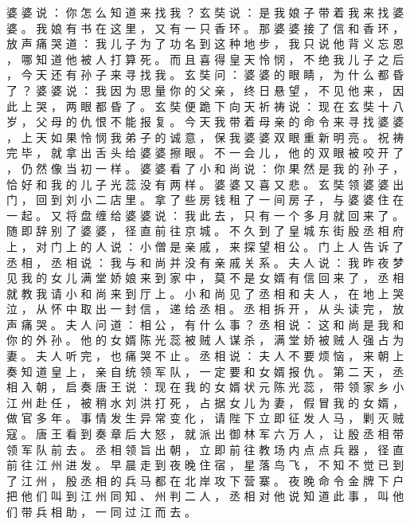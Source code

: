 {婆 婆 说 ： 你 怎 么 知 道 来 找 我 ？ 玄 奘 说 ： 是 我 娘 子 带 着 我 来 找 婆 婆 。
我 娘 有 书 在 这 里 ， 又 有 一 只 香 环 。
那 婆 婆 接 了 信 和 香 环 ， 放 声 痛 哭 道 ： 我 儿 子 为 了 功 名 到 这 种 地 步 ， 我 只 说 他 背 义 忘 恩 ， 哪 知 道 他 被 人 打 算 死 。
而 且 喜 得 皇 天 怜 悯 ， 不 绝 我 儿 子 之 后 ， 今 天 还 有 孙 子 来 寻 找 我 。
玄 奘 问 ： 婆 婆 的 眼 睛 ， 为 什 么 都 昏 了 ？ 婆 婆 说 ： 我 因 为 思 量 你 的 父 亲 ， 终 日 悬 望 ， 不 见 他 来 ， 因 此 上 哭 ， 两 眼 都 昏 了 。
玄 奘 便 跪 下 向 天 祈 祷 说 ： 现 在 玄 奘 十 八 岁 ， 父 母 的 仇 恨 不 能 报 复 。
今 天 我 带 着 母 亲 的 命 令 来 寻 找 婆 婆 ， 上 天 如 果 怜 悯 我 弟 子 的 诚 意 ， 保 我 婆 婆 双 眼 重 新 明 亮 。
祝 祷 完 毕 ， 就 拿 出 舌 头 给 婆 婆 擦 眼 。
不 一 会 儿 ， 他 的 双 眼 被 咬 开 了 ， 仍 然 像 当 初 一 样 。
婆 婆 看 了 小 和 尚 说 ： 你 果 然 是 我 的 孙 子 ， 恰 好 和 我 的 儿 子 光 蕊 没 有 两 样 。
婆 婆 又 喜 又 悲 。
玄 奘 领 婆 婆 出 门 ， 回 到 刘 小 二 店 里 。
拿 了 些 房 钱 租 了 一 间 房 子 ， 与 婆 婆 住 在 一 起 。
又 将 盘 缠 给 婆 婆 说 ： 我 此 去 ， 只 有 一 个 多 月 就 回 来 了 。
随 即 辞 别 了 婆 婆 ， 径 直 前 往 京 城 。
不 久 到 了 皇 城 东 街 殷 丞 相 府 上 ， 对 门 上 的 人 说 ： 小 僧 是 亲 戚 ， 来 探 望 相 公 。
门 上 人 告 诉 了 丞 相 ， 丞 相 说 ： 我 与 和 尚 并 没 有 亲 戚 关 系 。
夫 人 说 ： 我 昨 夜 梦 见 我 的 女 儿 满 堂 娇 娘 来 到 家 中 ， 莫 不 是 女 婿 有 信 回 来 了 ， 丞 相 就 教 我 请 小 和 尚 来 到 厅 上 。
小 和 尚 见 了 丞 相 和 夫 人 ， 在 地 上 哭 泣 ， 从 怀 中 取 出 一 封 信 ， 递 给 丞 相 。
丞 相 拆 开 ， 从 头 读 完 ， 放 声 痛 哭 。
夫 人 问 道 ： 相 公 ， 有 什 么 事 ？ 丞 相 说 ： 这 和 尚 是 我 和 你 的 外 孙 。
他 的 女 婿 陈 光 蕊 被 贼 人 谋 杀 ， 满 堂 娇 被 贼 人 强 占 为 妻 。
夫 人 听 完 ， 也 痛 哭 不 止 。
丞 相 说 ： 夫 人 不 要 烦 恼 ， 来 朝 上 奏 知 道 皇 上 ， 亲 自 统 领 军 队 ， 一 定 要 和 女 婿 报 仇 。
第 二 天 ， 丞 相 入 朝 ， 启 奏 唐 王 说 ： 现 在 我 的 女 婿 状 元 陈 光 蕊 ， 带 领 家 乡 小 江 州 赴 任 ， 被 稍 水 刘 洪 打 死 ， 占 据 女 儿 为 妻 ， 假 冒 我 的 女 婿 ， 做 官 多 年 。
事 情 发 生 异 常 变 化 ， 请 陛 下 立 即 征 发 人 马 ， 剿 灭 贼 寇 。
唐 王 看 到 奏 章 后 大 怒 ， 就 派 出 御 林 军 六 万 人 ， 让 殷 丞 相 带 领 军 队 前 去 。
丞 相 领 旨 出 朝 ， 立 即 前 往 教 场 内 点 点 兵 器 ， 径 直 前 往 江 州 进 发 。
早 晨 走 到 夜 晚 住 宿 ， 星 落 鸟 飞 ， 不 知 不 觉 已 到 了 江 州 ， 殷 丞 相 的 兵 马 都 在 北 岸 攻 下 营 寨 。
夜 晚 命 令 金 牌 下 户 把 他 们 叫 到 江 州 同 知 、 州 判 二 人 ， 丞 相 对 他 说 知 道 此 事 ， 叫 他 们 带 兵 相 助 ， 一 同 过 江 而 去 。
}
